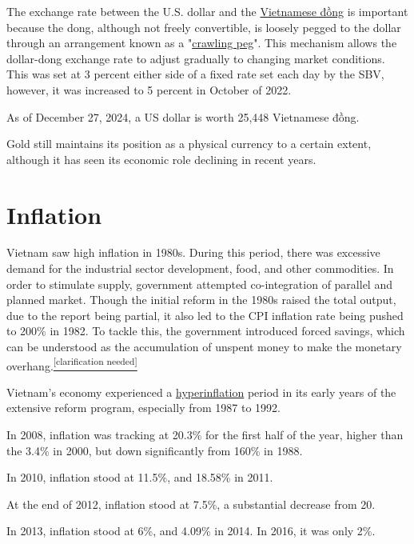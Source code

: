 \documentclass[openany]{book}
\begin{document}
The exchange rate between the U.S. dollar and the \href{https://en.wikipedia.org/wiki/Vietnamese_%C4%91%E1%BB%93ng}{Vietnamese đồng} is important because the dong, although not freely convertible, is loosely pegged to the dollar through an arrangement known as a "\href{https://en.wikipedia.org/wiki/Crawling_peg}{crawling peg}". This mechanism allows the dollar-dong exchange rate to adjust gradually to changing market conditions.\cite{36} This was set at 3 percent either side of a fixed rate set each day by the SBV, however, it was increased to 5 percent in October of 2022.\cite{92}

As of December 27, 2024, a US dollar is worth 25,448 Vietnamese đồng.

Gold still maintains its position as a physical currency to a certain extent, although it has seen its economic role declining in recent years.\cite{93}

\section{Inflation}

Vietnam saw high inflation in 1980s.\cite{94} During this period, there was excessive demand for the industrial sector development, food, and other commodities. In order to stimulate supply, government attempted co-integration of parallel and planned market. Though the initial reform\cite{95} in the 1980s raised the total output, due to the report being partial, it also led to the CPI inflation rate being pushed to 200\% in 1982. To tackle this, the government introduced forced savings, which can be understood as the accumulation of unspent money to make the monetary overhang.\href{https://en.wikipedia.org/wiki/Wikipedia:Please_clarify}{\textsuperscript{[clarification needed]}}

Vietnam's economy experienced a \href{https://en.wikipedia.org/wiki/Hyperinflation}{hyperinflation} period in its early years of the extensive reform program, especially from 1987 to 1992.\cite{96}

In 2008, inflation was tracking at 20.3\% for the first half of the year,\cite{97} higher than the 3.4\% in 2000, but down significantly from 160\% in 1988.\cite{36}

In 2010, inflation stood at 11.5\%, and 18.58\% in 2011.\cite{98}

At the end of 2012, inflation stood at 7.5\%, a substantial decrease from 20.\cite{99}

In 2013, inflation stood at 6\%,\cite{100} and 4.09\% in 2014.\cite{101} In 2016, it was only 2\%.
\end{document}

